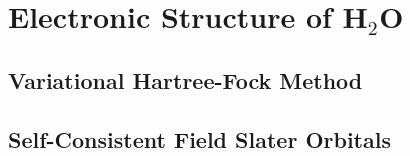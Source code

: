 \chapter{Electronic Structure of H$_{2}$O}
\label{cha:scf_h2o}


\section{Variational Hartree-Fock Method}
\section{Self-Consistent Field Slater Orbitals}

